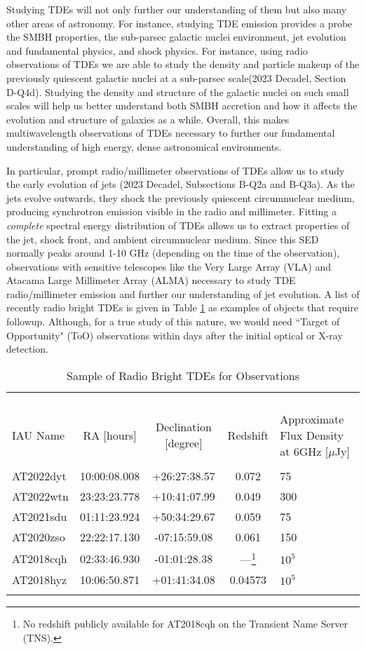 \documentclass[12pt]{article}
\begin{document}
\indent Studying TDEs will not only further our understanding of them but also many other areas of astronomy. For instance, studying TDE emission provides a probe the SMBH properties, the sub-parsec galactic nuclei environment, jet evolution and fundamental physics, and shock physics. For instance, using radio observations of TDEs we are able to study the density and particle makeup of the previously quiescent galactic nuclei at a sub-parsec scale(2023 Decadel, Section D-Q4d). Studying the density and structure of the galactic nuclei on such small scales will help us better understand both SMBH accretion and how it affects the evolution and structure of galaxies as a while. Overall, this makes multiwavelength observations of TDEs necessary to further our fundamental understanding of high energy, dense astronomical environments. 

\indent In particular, prompt radio/millimeter observations of TDEs allow us to study the early evolution of jets (2023 Decadel, Subsections B-Q2a and B-Q3a). As the jets evolve outwards, they shock the previously quiescent circumnuclear medium, producing synchrotron emission visible in the radio and millimeter. Fitting a \textit{complete} spectral energy distribution of TDEs allows us to extract properties of the jet, shock front, and ambient circumnuclear medium. Since this SED normally peaks around 1-10 GHz (depending on the time of the observation), observations with sensitive telescopes like the Very Large Array (VLA) and Atacama Large Millimeter Array (ALMA) necessary to study TDE radio/millimeter emission and further our understanding of jet evolution. A list of recently radio bright TDEs is given in Table \ref{tab:tdes} as examples of objects that require followup. Although, for a true study of this nature, we would need ``Target of Opportunity" (ToO) observations within days after the initial optical or X-ray detection.
\begin{longtable}{l c c c p{4.5cm}}    
    \centering \\
    \caption{Sample of Radio Bright TDEs for Observations} \\
    \label{tab:tdes} \\
     
     \hline \\
     IAU Name & RA [hours] & Declination [degree] & Redshift & Approximate Flux Density at 6GHz [$\mu$Jy] \\
     \hline \\
     AT2022dyt & 10:00:08.008 & +26:27:38.57 & 0.072 & 75 \\
     AT2022wtn & 23:23:23.778 & +10:41:07.99	& 0.049 & 300 \\
     AT2021sdu & 01:11:23.924 & +50:34:29.67 & 0.059 & 75 \\
     AT2020zso & 22:22:17.130 & -07:15:59.08 & 0.061 & 150 \\
     AT2018cqh & 02:33:46.930 & -01:01:28.38 & ---\footnote{No redshift publicly available for AT2018cqh on the Transient Name Server (TNS).} & $10^5$\\
     AT2018hyz & 10:06:50.871 & +01:41:34.08 & 0.04573 & $10^5$\\
     \hline \\
\end{longtable}
\end{document}
